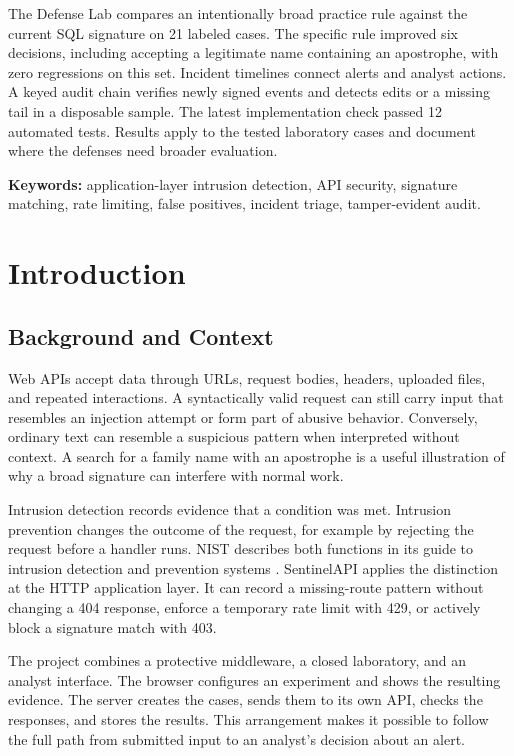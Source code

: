 \documentclass[11pt,letterpaper,oneside]{report}
\begin{document}
The Defense Lab compares an intentionally broad practice rule against the current SQL signature on 21 labeled cases. The specific rule improved six decisions, including accepting a legitimate name containing an apostrophe, with zero regressions on this set. Incident timelines connect alerts and analyst actions. A keyed audit chain verifies newly signed events and detects edits or a missing tail in a disposable sample. The latest implementation check passed 12 automated tests. Results apply to the tested laboratory cases and document where the defenses need broader evaluation.

\textbf{Keywords:} application-layer intrusion detection, API security, signature matching, rate limiting, false positives, incident triage, tamper-evident audit.

\tableofcontents
\clearpage
{}

\chapter{Introduction}
\section{Background and Context}
Web APIs accept data through URLs, request bodies, headers, uploaded files, and repeated interactions. A syntactically valid request can still carry input that resembles an injection attempt or form part of abusive behavior. Conversely, ordinary text can resemble a suspicious pattern when interpreted without context. A search for a family name with an apostrophe is a useful illustration of why a broad signature can interfere with normal work.

Intrusion detection records evidence that a condition was met. Intrusion prevention changes the outcome of the request, for example by rejecting the request before a handler runs. NIST describes both functions in its guide to intrusion detection and prevention systems \cite{nist}. SentinelAPI applies the distinction at the HTTP application layer. It can record a missing-route pattern without changing a 404 response, enforce a temporary rate limit with 429, or actively block a signature match with 403.

The project combines a protective middleware, a closed laboratory, and an analyst interface. The browser configures an experiment and shows the resulting evidence. The server creates the cases, sends them to its own API, checks the responses, and stores the results. This arrangement makes it possible to follow the full path from submitted input to an analyst's decision about an alert.
\end{document}
